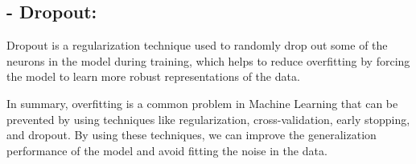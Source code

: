\subsection{- Dropout:}  Dropout is a regularization technique used to randomly drop out some of the neurons in the model during training, which helps to reduce overfitting by forcing the model to learn more robust representations of the data.

In summary, overfitting is a common problem in Machine Learning that can be prevented by using techniques like regularization, cross-validation, early stopping, and dropout. By using these techniques, we can improve the generalization performance of the model and avoid fitting the noise in the data.

